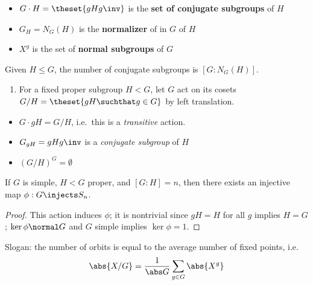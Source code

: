 \begin{itemize}
\item
  \(G\cdot H = \theset{gHg\inv}\) is the \textbf{set of conjugate
  subgroups} of \(H\)
\item
  \(G_H = N_G(H)\) is the \textbf{normalizer} of in \(G\) of \(H\)
\item
  \(X^g\) is the set of \textbf{normal subgroups} of \(G\)
\end{itemize}

\begin{corollary}

Given \(H \leq G\), the number of conjugate subgroups is
\([G: N_G(H)]\).

\end{corollary}

\begin{enumerate}
\def\labelenumi{\arabic{enumi}.}
\setcounter{enumi}{1}
\tightlist
\item
  For a fixed proper subgroup \(H< G\), let \(G\) act on its cosets
  \(G/H = \theset{gH\suchthat g\in G}\) by left translation.
\end{enumerate}

\begin{itemize}
\item
  \(G\cdot gH = G/H\), i.e.~this is a \emph{transitive} action.
\item
  \(G_{gH} = gHg\inv\) is a \emph{conjugate subgroup} of \(H\)
\item
  \((G/H)^G = \emptyset\)
\end{itemize}

\begin{proposition}

If \(G\) is simple, \(H < G\) proper, and \([G:H] = n\), then there
exists an injective map \(\phi: G \injects S_n\).

\end{proposition}

\begin{proof}

This action induces \(\phi\); it is nontrivial since \(gH = H\) for all
\(g\) implies \(H = G\); \(\ker \phi \normal G\) and \(G\) simple
implies \(\ker \phi = 1\).

\end{proof}

\begin{theorem}

Slogan: the number of orbits is equal to the average number of fixed
points, i.e.
\begin{align*}
\abs{X/G} = \frac{1}{\abs G }\sum_{g\in G} \abs {X^g}
\end{align*}

\end{theorem}

